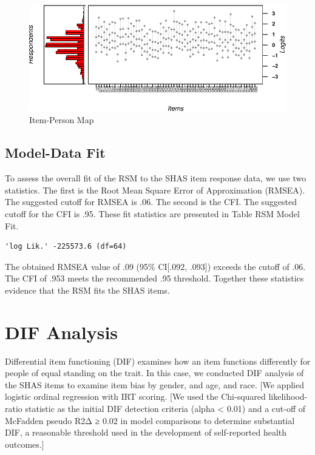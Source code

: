 \documentclass[
  letterpaper,
]{article}
\begin{document}
\begin{figure}

{\centering \includegraphics{./results_files/figure-pdf/fig-RSM-WrightMap-1.pdf}

}

\caption{\label{fig-RSM-WrightMap}Item-Person Map}

\end{figure}

\hypertarget{model-data-fit}{%
\subsection*{Model-Data Fit}\label{model-data-fit}}

To assess the overall fit of the RSM to the SHAS item response data, we
use two statistics. The first is the Root Mean Square Error of
Approximation (RMSEA). The suggested cutoff for RMSEA is .06. The second
is the CFI. The suggested cutoff for the CFI is .95. These fit
statistics are presented in Table RSM Model Fit.

\begin{verbatim}
'log Lik.' -225573.6 (df=64)
\end{verbatim}

The obtained RMSEA value of .09 (95\% CI{[}.092, .093{]}) exceeds the
cutoff of .06. The CFI of .953 meets the recommended .95 threshold.
Together these statistics evidence that the RSM fits the SHAS items.

\hypertarget{dif-analysis}{%
\section*{DIF Analysis}\label{dif-analysis}}

Differential item functioning (DIF) examines how an item functions
differently for people of equal standing on the trait. In this case, we
conducted DIF analysis of the SHAS items to examine item bias by gender,
and age, and race. {[}We applied logistic ordinal regression with IRT
scoring. {[}We used the Chi-squared likelihood-ratio statistic as the
initial DIF detection criteria (alpha \textless{} 0.01) and a cut-off of
McFadden pseudo R2Δ ≥ 0.02 in model comparisons to determine substantial
DIF, a reasonable threshold used in the development of self-reported
health outcomes.{]}
\end{document}

